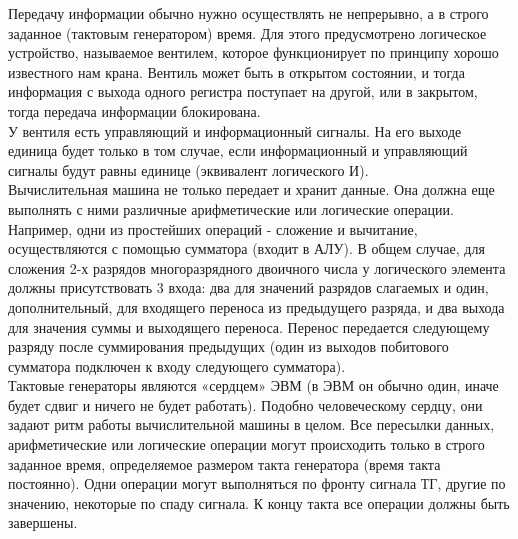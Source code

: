 Передачу информации обычно нужно осуществлять не непрерывно, а в строго заданное (тактовым генератором) время. Для этого предусмотрено логическое устройство, называемое вентилем, которое функционирует по принципу хорошо известного нам крана. Вентиль может быть в открытом состоянии, и тогда информация с выхода одного регистра поступает на другой, или в закрытом, тогда передача информации блокирована. \\
У вентиля есть управляющий и информационный сигналы. На его выходе единица будет только в том случае, если информационный и управляющий сигналы будут равны единице (эквивалент логического И). \\
Вычислительная машина не только передает и хранит данные. Она должна еще выполнять с ними различные арифметические или логические операции. Например, одни из простейших операций - сложение и вычитание, осуществляются с помощью сумматора (входит в АЛУ). В общем случае, для сложения 2-х разрядов многоразрядного двоичного числа у логического элемента должны присутствовать 3 входа: два для значений разрядов слагаемых и один, дополнительный, для входящего переноса из предыдущего разряда, и два выхода для значения суммы и выходящего переноса. Перенос передается следующему разряду после суммирования предыдущих (один из выходов побитового сумматора подключен к входу следующего сумматора). \\
Тактовые генераторы являются «сердцем» ЭВМ (в ЭВМ он обычно один, иначе будет сдвиг и ничего не будет работать). Подобно человеческому сердцу, они задают ритм работы вычислительной машины в целом. Все пересылки данных, арифметические или логические операции могут происходить только в строго заданное время, определяемое размером такта генератора (время такта постоянно). Одни операции могут выполняться по фронту сигнала ТГ, другие по значению, некоторые по спаду сигнала. К концу такта все операции должны быть завершены.  \\

